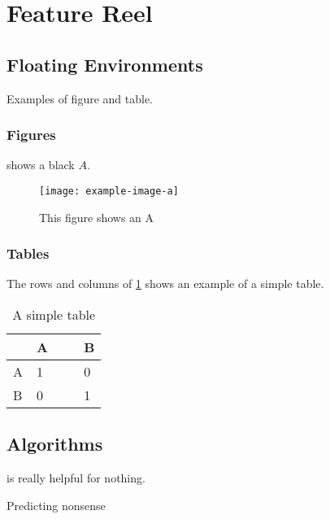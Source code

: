 \documentclass[logo]{mlai-report}
\begin{document}
	\section{Feature Reel} 
	
	\subsection{Floating Environments} 
	Examples of figure and table.
	\subsubsection{Figures}
	 shows a black $A$.
		\begin{figure}[tp] 
		\centering
		\texttt{[image: example-image-a]} 
		\caption{This figure shows an A} 
		\label{fig:example-image} 
	\end{figure}
	\subsubsection{Tables}
	The rows and columns of \cref{tab:simple-table} shows an example of a simple table.
	\begin{table}[t]
		\centering
		\renewcommand{\arraystretch}{1.3}
		\begin{tabular}{l|p{0.5\linewidth}|p{0.25\linewidth}}
			 & A & B \\\hline
			A & 1 & 0 \\
			B & 0 & 1 \\
		\end{tabular}
		\caption{\label{tab:simple-table}A simple table}
	\end{table}
	
	
	\subsection{Algorithms}
	 is really helpful for nothing.
	\begin{algorithm}
		\caption{\label{alg:nonsense} Predicting nonsense}
		
\end{algorithm}
\end{document}
